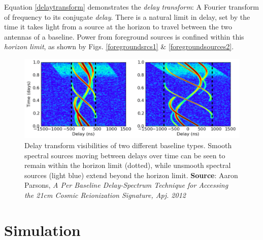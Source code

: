 \documentclass[a0,landscape]{a0poster}
\begin{document}
\begin{multicols}{4}
Equation \ref{delaytransform} demonstrates the \emph{delay transform}: A Fourier transform of frequency to its conjugate \emph{delay}. There is a natural limit in delay, set by the time it takes light from a source at the horizon to travel between the two antennas of a baseline. Power from foreground sources is confined within this \emph{horizon limit}, as shown by Figs. \ref{foregroundsrcs1} \& \ref{foregroundsources2}.


\begin{figure}[H]
\centering
\includegraphics[width=0.8\linewidth]{figures/delaytransform.png}
\caption{Delay transform visibilities of two different baseline types. Smooth spectral sources moving between delays over time can be seen to remain within the horizon limit (dotted), while unsmooth spectral sources (light blue) extend beyond the horizon limit.  \textbf{Source}: Aaron Parsons, \textit{A Per Baseline Delay-Spectrum Technique for Accessing the 21cm Cosmic Reionization Signature, Apj. 2012}}
\label{foregroundsrcs2}
\end{figure}


\section*{Simulation}


\end{multicols}
\end{document}
